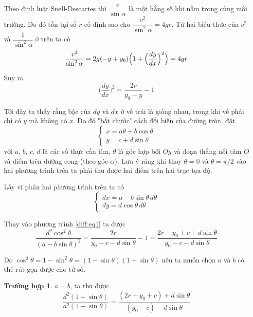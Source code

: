 \documentclass{mynotes}
\theoremstyle{definition}
\begin{document}
Theo định luật Snell-Descartes thì $\dfrac{v}{\sin \alpha}$ là một hằng số khi nằm trong cùng môi trường. Do đó tồn tại số $r$ cố định sao cho $\dfrac{v^2}{\sin^2 \alpha} = 4 g r$. Từ hai biểu thức của $v^2$ và $\dfrac{1}{\sin^2 \alpha}$ ở trên ta có
\begin{equation}
    \frac{v^2}{\sin^2 \alpha} = 2 g (-y + y_0) \Bigl( 1 + \Bigl(\frac{dy}{dx}\Bigr)^2 \Bigr) = 4 g r
\end{equation}

Suy ra
\begin{equation}
    \Big(\frac{dy}{dx}\Big)^2 = \frac{2 r}{y_0 - y} - 1
    \label{diff:eq1}
\end{equation}

Tới đây ta thấy rằng bậc của $dy$ và $dx$ ở vế trái là giống nhau, trong khi vế phải chỉ có $y$ mà không có $x$. Do đó "bắt chước" cách đổi biến của đường tròn, đặt
\begin{equation*}
    \begin{cases}
        x = a \theta + b \cos \theta \\
        y = c + d \sin \theta
    \end{cases}
\end{equation*}
với $a$, $b$, $c$, $d$ là các số thực cần tìm, $\theta$ là góc hợp bởi $Oy$ và đoạn thẳng nối tâm $O$ và điểm trên đường cong (theo góc $\alpha$). Lưu ý rằng khi thay $\theta = 0$ và $\theta = \pi / 2$ vào hai phương trình trên ta phải thu được hai điểm trên hai trục tọa độ.

Lấy vi phân hai phương trình trên ta có
\begin{equation*}
    \begin{cases}
    dx = a - b \sin \theta \, d \theta \\ dy = d \cos \theta \, d \theta
\end{cases}
\end{equation*}

Thay vào phương trình \ref{diff:eq1} ta được
\begin{equation*}
    \frac{d^2 \cos^2 \theta}{(a - b \sin \theta)^2} = \frac{2 r}{y_0 - c - d \sin \theta} - 1 = \frac{2 r - y_0 + c + d \sin \theta}{y_0 - c - d \sin \theta}
\end{equation*}

Do $\cos^2 \theta = 1 - \sin^2 \theta = (1 - \sin \theta)(1 + \sin \theta)$ nên ta muốn chọn $a$ và $b$ có thể rút gọn được cho tử số. 

\textbf{Trường hợp 1}. $a = b$, ta thu được
\begin{equation*}
    \frac{d^2 (1 + \sin \theta)}{a^2 (1 - \sin \theta)} = \frac{(2 r - y_0 + c) + d \sin \theta}{(y_0 - c) - d \sin \theta}
\end{equation*}
\end{document}
